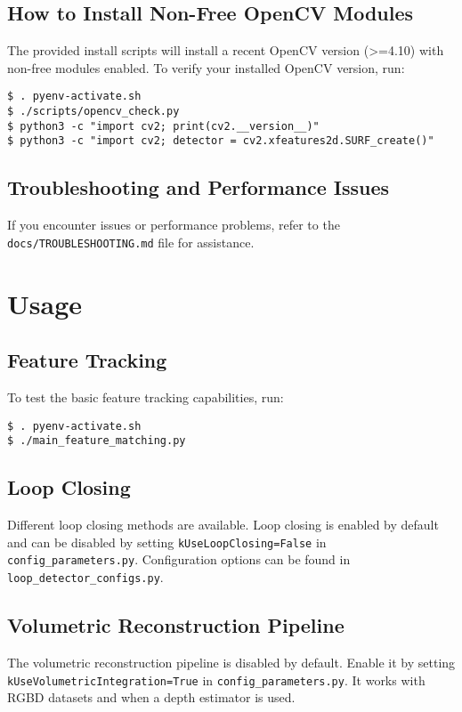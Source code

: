 \documentclass{article}
\begin{document}
\subsection{How to Install Non-Free OpenCV Modules}
The provided install scripts will install a recent OpenCV version (>=4.10) with non-free modules enabled. To verify your installed OpenCV version, run:
\begin{verbatim}
$ . pyenv-activate.sh
$ ./scripts/opencv_check.py
$ python3 -c "import cv2; print(cv2.__version__)"
$ python3 -c "import cv2; detector = cv2.xfeatures2d.SURF_create()"
\end{verbatim}

\subsection{Troubleshooting and Performance Issues}
If you encounter issues or performance problems, refer to the \texttt{docs/TROUBLESHOOTING.md} file for assistance.

\section{Usage}

\subsection{Feature Tracking}
To test the basic feature tracking capabilities, run:
\begin{verbatim}
$ . pyenv-activate.sh
$ ./main_feature_matching.py
\end{verbatim}

\subsection{Loop Closing}
Different loop closing methods are available. Loop closing is enabled by default and can be disabled by setting \texttt{kUseLoopClosing=False} in \texttt{config\_parameters.py}. Configuration options can be found in \texttt{loop\_detector\_configs.py}.

\subsection{Volumetric Reconstruction Pipeline}
The volumetric reconstruction pipeline is disabled by default. Enable it by setting \texttt{kUseVolumetricIntegration=True} in \texttt{config\_parameters.py}. It works with RGBD datasets and when a depth estimator is used.
\end{document}
